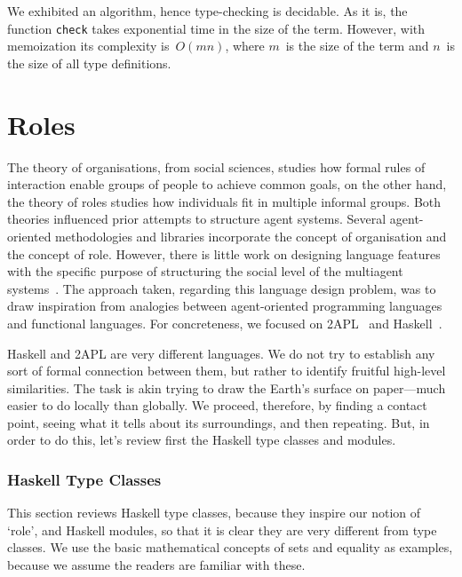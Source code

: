 \documentclass[a4paper,12pt,oneside,fleqn]{book} %
\newcommand{\rg}[1]{\marginpar{\tiny\raggedright\textcolor{blue}{\bf rg:} #1}}
\renewcommand{\rg}{}
\begin{document}
We exhibited an algorithm, hence type-checking is decidable. As it is, the
function \verb|check| takes exponential time in the size of the term.
However, with memoization its complexity is~$O(mn)$, where $m$~is the
size of the term and $n$~is the size of all type definitions.

\section{Roles}\label{sec:roles} %
The theory of organisations, from social sciences, studies how formal rules
of interaction enable groups of people to achieve common goals, on the
other hand, the theory of roles studies how individuals fit in multiple
informal groups. Both theories influenced prior attempts to structure agent
systems. Several agent-oriented methodologies and libraries incorporate the
concept of organisation and the concept of role.  However, there is little
work on designing language features with the specific purpose of
structuring the social level of the multiagent
systems~\cite{collier2005,DBLP:journals/entcs/BaldoniBT06,DBLP:conf/oopsla/RicciS11}.
The approach taken, regarding this language design problem, was to draw
inspiration from analogies between agent-oriented programming languages and
functional languages. For concreteness, we focused on
2APL~\cite{DBLP:journals/aamas/Dastani08} and Haskell~\cite{web:haskell}.

Haskell and 2APL are very different languages. We do not try to establish
any sort of formal connection between them, but rather to identify fruitful
high-level similarities. The task is akin trying to draw the Earth's
surface on paper---much easier to do locally than globally. We proceed,
therefore, by finding a contact point, seeing what it tells about its
surroundings, and then repeating. But, in order to do this, let's review
first the Haskell type classes and modules.

\subsubsection{Haskell Type Classes} %

This section reviews Haskell type classes, because they inspire our notion
of `role', and Haskell modules, so that it is clear they are very different
from type classes. We use the basic mathematical concepts of sets and
equality as examples, because we assume the readers are familiar with these.
\end{document}
